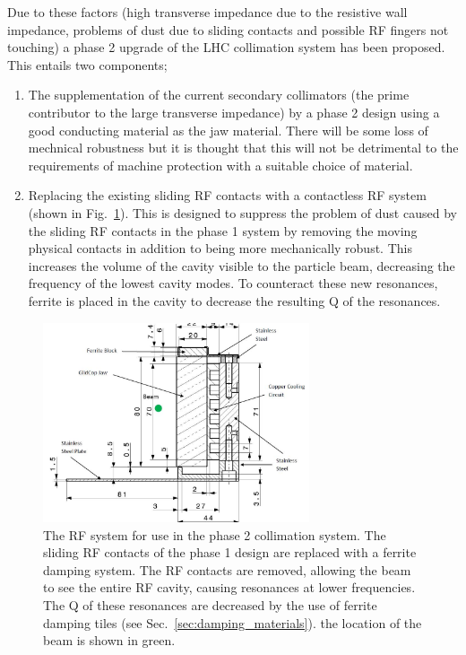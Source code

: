 Due to these factors (high transverse impedance due to the resistive wall impedance, problems of dust due to sliding contacts and possible RF fingers not touching) a phase 2 upgrade of the LHC collimation system has been proposed. This entails two components;

\begin{enumerate}
\item{The supplementation of the current secondary collimators (the prime contributor to the large transverse impedance) by a phase 2 design using a good conducting material as the jaw material. There will be some loss of mechnical robustness but it is thought that this will not be detrimental to the requirements of machine protection with a suitable choice of material.}
\item{Replacing the existing sliding RF contacts with a contactless RF system (shown in Fig.~\ref{fig:phase-2-rf-system}). This is designed to suppress the problem of dust caused by the sliding RF contacts in the phase 1 system by removing the moving physical contacts in addition to being more mechanically robust. This increases the volume of the cavity visible to the particle beam, decreasing the frequency of the lowest cavity modes. To counteract these new resonances, ferrite is placed in the cavity to decrease the resulting Q of the resonances.}
\end{enumerate}

\begin{figure}
\begin{center}
\includegraphics[width=0.7\textwidth]{LHC_Collimation_Upgrades/figures/cu-geo.jpg}
\end{center}
\caption{The RF system for use in the phase 2 collimation system. The sliding RF contacts of the phase 1 design are replaced with a ferrite damping system. The RF contacts are removed, allowing the beam to see the entire RF cavity, causing resonances at lower frequencies. The Q of these resonances are decreased by the use of ferrite damping tiles (see Sec.~\ref{sec:damping_materials}). the location of the beam is shown in green.}
\label{fig:phase-2-rf-system}
\end{figure}

